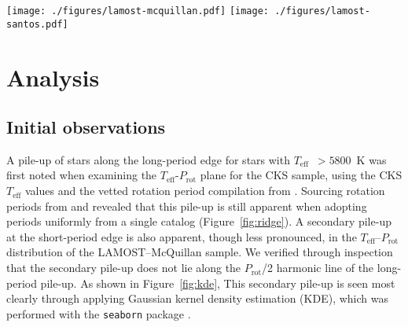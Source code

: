 \documentclass[linenumbers,tighten,trackchanges,twocolumn]{aastex631}
\newcommand{\lamostmcq}{LAMOST--McQuillan\xspace}
\newcommand{\lamostsan}{LAMOST--Santos\xspace}
\newcommand{\teff}{\ensuremath{T_{\mathrm{eff}}}\xspace}
\newcommand{\logg}{\ensuremath{\log g}\xspace}
\newcommand{\prot}{\ensuremath{P_\mathrm{rot}}\xspace}
\begin{document}
\begin{figure*}
    \centering
    \texttt{[image: ./figures/lamost-mcquillan.pdf]}
    \texttt{[image: ./figures/lamost-santos.pdf]}
    \caption{Two-dimensional histograms indicating the number of Kepler target stars in the \teff–\prot plane for the \lamostmcq sample (top row) and the \lamostsan sample (bottom row). The effects of a simple cut in \logg to separate subgiants and dwarfs are shown in the middle and right columns. In each panel the Sun is indicated by the orange point, with an errorbar reflecting the range of periods measured from its differentially rotating surface. The long-period pile-up for dwarf stars is clearly seen to extend to the solar temperature. The short-period pile-up is clearer in the smaller \lamostmcq dwarf sample, potentially because the \citet{Santos2021} catalog detected more stars at longer periods. The secondary overdensity observed in the subgiant samples, most visible in the bottom center panel, appears to be at twice the period of the primary overdensity, potentially due to erroneously determined rotation periods.}
    \label{fig:xmatch}
\end{figure*}


\section{Analysis}
\label{sec:analysis}

\subsection{Initial observations}
A pile-up of stars along the long-period edge for stars with \teff~$>5800$~K was first noted when examining the \teff-\prot plane for the CKS sample, using the CKS \teff values and the vetted rotation period compilation from \citet{David2021}. Sourcing rotation periods from \citet{McQuillan2013, Mazeh2015} and \citet{Angus2018} revealed that this pile-up is still apparent when adopting periods uniformly from a single catalog (Figure~\ref{fig:ridge}). A secondary pile-up at the short-period edge is also apparent, though less pronounced, in the \teff--\prot distribution of the \lamostmcq sample. {\color{red} We verified through inspection that the secondary pile-up does not lie along the \prot/2 harmonic line of the long-period pile-up.} As shown in Figure~\ref{fig:kde}, This secondary pile-up is seen most clearly through applying Gaussian kernel density estimation (KDE), which was performed with the \texttt{seaborn} package \citep{seaborn}. 
\end{document}
